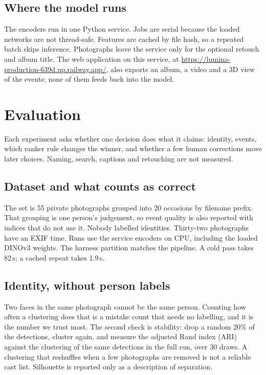 \documentclass[conference]{IEEEtran}
\begin{document}
\subsection{Where the model runs}
\label{sec:system}

The encoders run in one Python service. Jobs are serial because the loaded
networks are not thread-safe. Features are cached by file hash, so a repeated
batch skips inference. Photographs leave the service only for the optional
retouch and album title. The web application on this service, at
\url{https://lumina-production-639d.up.railway.app/}, also exports an album,
a video and a 3D view of the events; none of them feeds back into the model.

\section{Evaluation}
\label{sec:eval}

Each experiment asks whether one decision does what it claims: identity,
events, which ranker rule changes the winner, and whether a few human
corrections move later choices. Naming, search, captions and retouching are
not measured.

\subsection{Dataset and what counts as correct}
\label{sec:protocol}

The set is 55 private photographs grouped into 20 occasions by filename prefix.
That grouping is one person's judgement, so event quality is also reported
with indices that do not use it. Nobody labelled identities. Thirty-two
photographs have an EXIF time. Runs use the service encoders on CPU, including
the loaded \mbox{DINOv3} weights. The harness partition matches the pipeline.
A cold pass takes 82\,s; a cached repeat takes 1.9\,s.

\subsection{Identity, without person labels}
\label{sec:id-eval}

Two faces in the same photograph cannot be the same person. Counting how often
a clustering does that is a mistake count that needs no labelling, and it is
the number we trust most. The second check is stability: drop a random 20\% of
the detections, cluster again, and measure the adjusted Rand index
(ARI)~\cite{hubert1985comparing} against the clustering of the same detections
in the full run, over 30 draws. A clustering that reshuffles when a few
photographs are removed is not a reliable cast list. Silhouette is reported
only as a description of separation.
\end{document}
